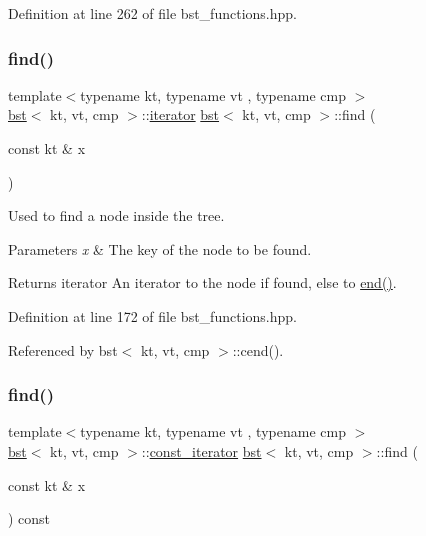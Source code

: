 Definition at line 262 of file bst\+\_\+functions.\+hpp.

\mbox{\label{classbst_a6c2bdb4e40b2a6871840af57f42765f8}} 
\subsubsection{\texorpdfstring{find()}{find()}\hspace{0.1cm}{\footnotesize\ttfamily [1/2]}}
{\footnotesize\ttfamily template$<$typename kt, typename vt , typename cmp $>$ \\
\hyperlink{classbst}{bst}$<$ kt, vt, cmp $>$\+::\hyperlink{classbst_a429b0445783ff6486882db5dee900ce0}{iterator} \hyperlink{classbst}{bst}$<$ kt, vt, cmp $>$\+::find (\begin{DoxyParamCaption}\item[{const kt \&}]{x }\end{DoxyParamCaption})\hspace{0.3cm}{\ttfamily [noexcept]}}



Used to find a node inside the tree. 


\begin{DoxyParams}{Parameters}
{\em x} & The key of the node to be found. \\
\hline
\end{DoxyParams}
\begin{DoxyReturn}{Returns}
iterator An iterator to the node if found, else to \hyperlink{classbst_aed3a831efc810b5084cb0c9f4adeb16a}{end()}. 
\end{DoxyReturn}


Definition at line 172 of file bst\+\_\+functions.\+hpp.



Referenced by bst$<$ kt, vt, cmp $>$\+::cend().

\mbox{\label{classbst_a2971e3ad8b28cf5bdf08128eee48d26d}} 
\subsubsection{\texorpdfstring{find()}{find()}\hspace{0.1cm}{\footnotesize\ttfamily [2/2]}}
{\footnotesize\ttfamily template$<$typename kt, typename vt , typename cmp $>$ \\
\hyperlink{classbst}{bst}$<$ kt, vt, cmp $>$\+::\hyperlink{classbst_a72485696d999bf489c6156f6327a2163}{const\+\_\+iterator} \hyperlink{classbst}{bst}$<$ kt, vt, cmp $>$\+::find (\begin{DoxyParamCaption}\item[{const kt \&}]{x }\end{DoxyParamCaption}) const\hspace{0.3cm}{\ttfamily [noexcept]}}



